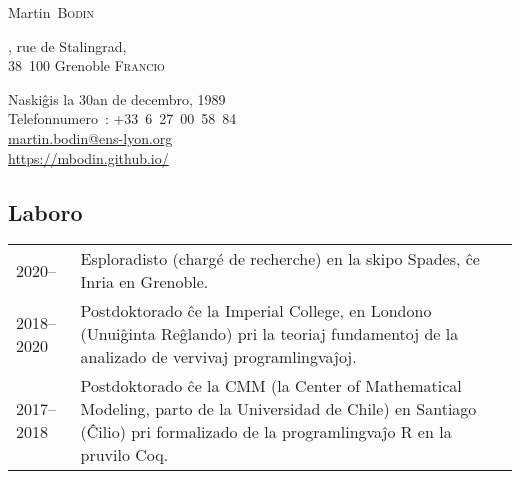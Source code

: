 \documentclass[12pt,a4paper]{article}
\makeatletter
\newcommand{\en}[1]{\foreignlanguage{english}{{#1}}}
\newcommand{\es}[1]{\foreignlanguage{spanish}{{#1}}}
\newcommand{\en}[1]{\foreignlanguage{english}{{#1}}}
\newcommand{\es}[1]{\foreignlanguage{spanish}{{#1}}}
\newenvironment{datecvsection}[1]%
               {\subsection*{#1}%
                 \noindent \begin{tabular}{@{}p{\annee}p{\texte}@{}}}
               {\end{tabular}}
\newcommand\familyName{\textsc}
\newcommand\placeName{}
\makeatother
\begin{document}
\pagestyle{empty}


\newlength{\annee}
\settowidth{\annee}{9999--9999}


\newlength{\texte}
\setlength{\texte}{\textwidth} \addtolength{\texte}{-\annee} 
	\addtolength{\texte}{-2\tabcolsep}

\begin{center} \Huge Martin~\familyName{Bodin} \end{center}

\noindent
\parbox[c]{.5\textwidth}
{
  , rue de Stalingrad, \\
	38~100 Grenoble
  \textsc{Francio}
}
\parbox[c]{.5\textwidth}
{
\begin{flushright}
  Naskiĝis la 30an de decembro, 1989 \\
  \noindent Telefonnumero~: \mbox{+33 6 27 00 58 84} \\
  \url{martin.bodin@ens-lyon.org} \\
  \url{https://mbodin.github.io/}
\end{flushright}
}


\begin{datecvsection}{Laboro}

		2020– & Esploradisto (chargé de recherche) en la skipo \placeName{Spades}, ĉe \placeName{Inria} en \placeName{Grenoble}. \\

    2018–2020 & Postdoktorado ĉe la \en{\placeName{Imperial College}}, en \placeName{Londono} (\placeName{Unuiĝinta Reĝlando}) pri la teoriaj fundamentoj de la analizado de vervivaj programlingvaĵoj. \\

    2017–2018 & Postdoktorado ĉe la \placeName{CMM} (la \en{\placeName{Center of Mathematical Modeling}}, parto de la \es{\placeName{Universidad de Chile}}) en \placeName{Santiago} (\placeName{Ĉilio}) pri formalizado de la programlingvaĵo R en la pruvilo Coq. \\

\end{datecvsection}
\end{document}

